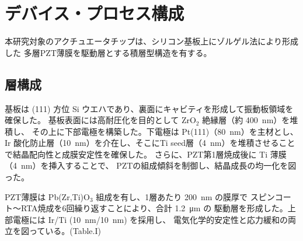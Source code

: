 \documentclass[conference]{IEEEtran}
\begin{document}
\section{デバイス・プロセス構成}
本研究対象のアクチュエータチップは、シリコン基板上にゾルゲル法により形成した
多層PZT薄膜を駆動層とする積層型構造を有する。

\subsection{層構成}
基板は (111) 方位 Si ウエハであり、裏面にキャビティを形成して振動板領域を確保した。
基板表面には高耐圧化を目的として ZrO$_2$ 絶縁層（約 \SI{400}{nm}）を堆積し、
その上に下部電極を構築した。下電極は Pt(111)（\SI{80}{nm}）を主材とし、
Ir 酸化防止層（\SI{10}{nm}）を介在し、そこにTi seed層（\SI{4}{nm}）を堆積させることで結晶配向性と成膜安定性を確保した。
さらに、PZT第1層焼成後に Ti 薄膜（\SI{4}{nm}）を挿入することで、
PZTの組成傾斜を制御し、結晶成長の均一化を図った。

PZT薄膜は Pb(Zr,Ti)O$_3$ 組成を有し、1層あたり \SI{200}{nm} の膜厚で
スピンコート～RTA焼成を6回繰り返すことにより、合計 \SI{1.2}{\micro\metre} の
駆動層を形成した。上部電極には Ir/Ti (\SI{10}{nm}/\SI{10}{nm}) を採用し、
電気化学的安定性と応力緩和の両立を図っている。(Table.I)
\end{document}

